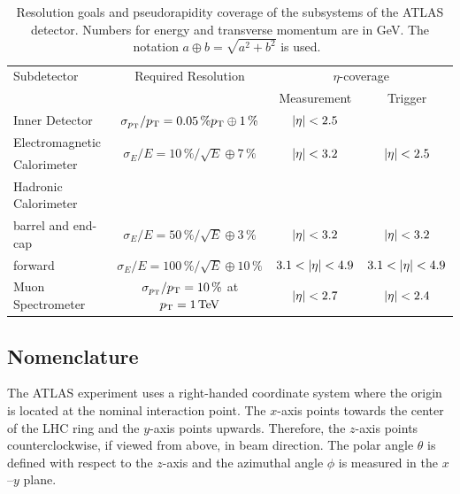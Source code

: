 \begin{table}[htpb]
    \centering
    \caption{Resolution goals and pseudorapidity coverage of the subsystems of the ATLAS detector.
            Numbers for energy and transverse momentum are in GeV.
            The notation $a \oplus b = \sqrt{a^2 + b^2}$ is used.~\cite{ATLAS}}\label{tab:setup:resolution}
    {\small
    \begin{tabular}{@{}lccc@{}}
        \toprule
        Subdetector & Required Resolution & \multicolumn{2}{c}{$\eta$-coverage}   \\
                    &                     & Measurement & Trigger \\ \midrule
        Inner Detector & $\sigma_{p_\text{T}} / p_\text{T} = 0.05\,\% p_\text{T} \oplus 1\,\%$ & $\left|\eta\right| < 2.5$ & \\ \cmidrule{0-3}
        Electromagnetic & \multirow{2}{*}{$\sigma_E / E = 10\,\% / \sqrt{E} \oplus 7\,\%$} & \multirow{2}{*}{$\left|\eta\right| < 3.2$} & \multirow{2}{*}{$\left|\eta\right| < 2.5$} \\
        Calorimeter & & & \\ \cmidrule{0-3}
        Hadronic Calorimeter & & & \\
        \quad barrel and end-cap & $\sigma_E / E = 50\,\% / \sqrt{E} \oplus 3\,\% $ & $\left|\eta\right| < 3.2$ & $\left|\eta\right| < 3.2$ \\
        \quad forward & $\sigma_E / E = 100\,\% / \sqrt{E} \oplus 10\,\% $ & $3.1 < \left|\eta\right| < 4.9$ & $3.1 < \left|\eta\right| < 4.9$ \\ \cmidrule{0-3}
        Muon Spectrometer & $\sigma_{p_\text{T}} / p_\text{T} = 10\,\%$ at $\pt = \SI{1}{\TeV}$ & $\left|\eta\right| < 2.7$ & $\left|\eta\right| < 2.4$ \\ \bottomrule
    \end{tabular}
    }
\end{table}


\subsection{Nomenclature}\label{sub:setup:nomenclature}

The ATLAS experiment uses a right-handed coordinate system where the origin is located at the nominal interaction point.
The $x$-axis points towards the center of the LHC ring and the $y$-axis points upwards.
Therefore, the $z$-axis points counterclockwise, if viewed from above, in beam direction.
The polar angle $\theta$ is defined with respect to the $z$-axis and the azimuthal angle $\phi$ is measured
in the $x$\nobreakdash--$y$ plane.

